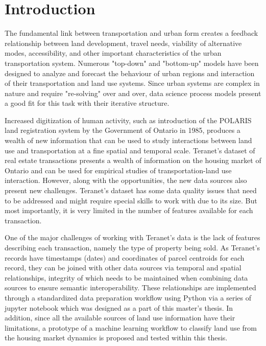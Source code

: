 \chapter[Introduction]{Introduction} \label{ch:introduction}

The fundamental link between transportation and urban form creates a feedback relationship between land development, travel needs, viability of alternative modes, accessibility, and other important characteristics of the urban transportation system.
Numerous "top-down" and "bottom-up" models have been designed to analyze and forecast the behaviour of urban regions and interaction of their transportation and land use systems.
Since urban systems are complex in nature and require "re-solving" over and over, data science process models present a good fit for this task with their iterative structure.

Increased digitization of human activity, such as introduction of the POLARIS land registration system by the Government of Ontario in 1985, produces a wealth of new information that can be used to study interactions between land use and transportation at a fine spatial and temporal scale.
Teranet's dataset of real estate transactions presents a wealth of information on the housing market of Ontario and can be used for empirical studies of transportation-land use interaction.
However, along with the opportunities, the new data sources also present new challenges.
Teranet's dataset has some data quality issues that need to be addressed and might require special skills to work with due to its size.
But most importantly, it is very limited in the number of features available for each transaction.

One of the major challenges of working with Teranet's data is the lack of features describing each transaction, namely the type of property being sold.
As Teranet's records have timestamps (dates) and coordinates of parcel centroids for each record, they can be joined with other data sources via temporal and spatial relationships, integrity of which needs to be maintained when combining data sources to ensure semantic interoperability.
These relationships are implemented through a standardized data preparation workflow using Python via a series of jupyter notebook which was designed as a part of this master's thesis.
In addition, since all the available sources of land use information have their limitations, a prototype of a machine learning workflow to classify land use from the housing market dynamics is proposed and tested within this thesis.

